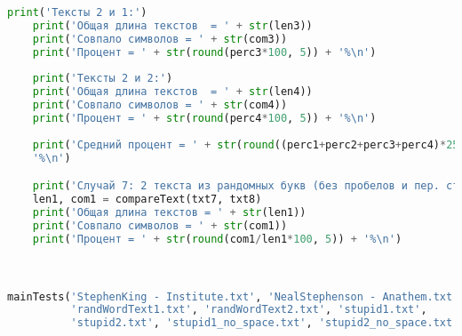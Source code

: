 \documentclass[12pt]{article}
\begin{document}
\begin{lstlisting}[language=Python]
    print('Тексты 2 и 1:')
    print('Общая длина текстов  = ' + str(len3))
    print('Совпало символов = ' + str(com3))
    print('Процент = ' + str(round(perc3*100, 5)) + '%\n')
    
    print('Тексты 2 и 2:')
    print('Общая длина текстов  = ' + str(len4))
    print('Совпало символов = ' + str(com4))
    print('Процент = ' + str(round(perc4*100, 5)) + '%\n')
    
    print('Средний процент = ' + str(round((perc1+perc2+perc3+perc4)*25, 5)) +
    '%\n')

    print('Случай 7: 2 текста из рандомных букв (без пробелов и пер. строк)\n')
    len1, com1 = compareText(txt7, txt8)
    print('Общая длина текстов = ' + str(len1))
    print('Совпало символов = ' + str(com1))
    print('Процент = ' + str(round(com1/len1*100, 5)) + '%\n')



mainTests('StephenKing - Institute.txt', 'NealStephenson - Anathem.txt',
          'randWordText1.txt', 'randWordText2.txt', 'stupid1.txt',
          'stupid2.txt', 'stupid1_no_space.txt', 'stupid2_no_space.txt')

\end{lstlisting}
\end{document}
